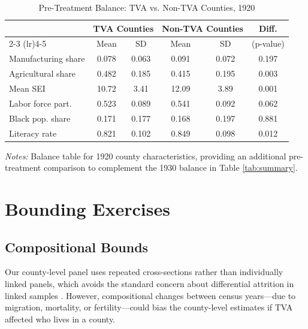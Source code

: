 \documentclass[12pt]{article}
\begin{document}
\begin{table}[htbp]
\centering
\caption{Pre-Treatment Balance: TVA vs. Non-TVA Counties, 1920}
\label{tab:balance_1920}
\footnotesize
\begin{tabular}{lccccc}
\toprule
 & \multicolumn{2}{c}{TVA Counties} & \multicolumn{2}{c}{Non-TVA Counties} & Diff. \\
\cmidrule(lr){2-3} \cmidrule(lr){4-5}
 & Mean & SD & Mean & SD & (p-value) \\
\midrule
Manufacturing share & 0.078 & 0.063 & 0.091 & 0.072 & 0.197 \\
Agricultural share & 0.482 & 0.185 & 0.415 & 0.195 & 0.003 \\
Mean SEI & 10.72 & 3.41 & 12.09 & 3.89 & 0.001 \\
Labor force part. & 0.523 & 0.089 & 0.541 & 0.092 & 0.062 \\
Black pop. share & 0.171 & 0.177 & 0.168 & 0.197 & 0.881 \\
Literacy rate & 0.821 & 0.102 & 0.849 & 0.098 & 0.012 \\
\bottomrule
\end{tabular}
\begin{minipage}{0.95\textwidth}
\vspace{0.5em}
\footnotesize
\textit{Notes:} Balance table for 1920 county characteristics, providing an additional pre-treatment comparison to complement the 1930 balance in Table \ref{tab:summary}.
\end{minipage}
\end{table}



\section{Bounding Exercises}\label{app:bounds}

\subsection{Compositional Bounds}

Our county-level panel uses repeated cross-sections rather than individually linked panels, which avoids the standard concern about differential attrition in linked samples \citep{lee2009, bailey2020}. However, compositional changes between census years---due to migration, mortality, or fertility---could bias the county-level estimates if TVA affected who lives in a county.
\end{document}
